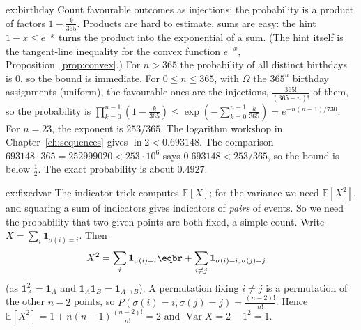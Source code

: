\begin{solution}{ex:birthday}
\idea Count favourable outcomes as injections: the probability is a product of factors $1-\frac k{365}$. Products are hard to estimate, sums are easy: the hint $1-x\le e^{-x}$ turns the product into the exponential of a sum. (The hint itself is the tangent-line inequality for the convex function $e^{-x}$, Proposition~\ref{prop:convex}.)
\writeup For $n>365$ the probability of all distinct birthdays is $0$, so the bound is immediate. For $0\le n\le365$, with $\Omega$ the $365^n$ birthday assignments (uniform), the favourable ones are the injections, $\frac{365!}{(365-n)!}$ of them, so the probability is $\prod_{k=0}^{n-1}\left(1-\frac k{365}\right)\le\exp\left(-\sum_{k=0}^{n-1}\frac k{365}\right)=e^{-n(n-1)/730}$.
For $n=23$, the exponent is $253/365$. The logarithm workshop in Chapter~\ref{ch:sequences} gives $\ln2<0.693148$. The comparison $693148\cdot365=252999020<253\cdot10^6$ says $0.693148<253/365$, so the bound is below $\frac12$.
The exact probability is about $0.4927$.
\end{solution}

\begin{solution}{ex:fixedvar}
\idea The indicator trick computes $\mathbb E[X]$; for the variance we need $\mathbb E[X^2]$, and squaring a sum of indicators gives indicators of \emph{pairs} of events. So we need the probability that two given points are both fixed, a simple count.
\writeup Write $X=\sum_i\mathbf 1_{\sigma(i)=i}$. Then
\[
\begin{aligned}X^2&=\sum_i\mathbf 1_{\sigma(i)=i}\eqbr+\sum_{i\ne j}\mathbf 1_{\sigma(i)=i,\,\sigma(j)=j}\end{aligned}
\]
(as $\mathbf 1_A^2=\mathbf 1_A$ and $\mathbf 1_A\mathbf 1_B=\mathbf 1_{A\cap B}$). A permutation fixing $i\ne j$ is a permutation of the other $n-2$ points,
so $P(\sigma(i)=i,\sigma(j)=j)=\frac{(n-2)!}{n!}$. Hence $\mathbb E[X^2]=1+n(n-1)\frac{(n-2)!}{n!}=2$ and $\operatorname{Var}X=2-1^2=1$.
\end{solution}

